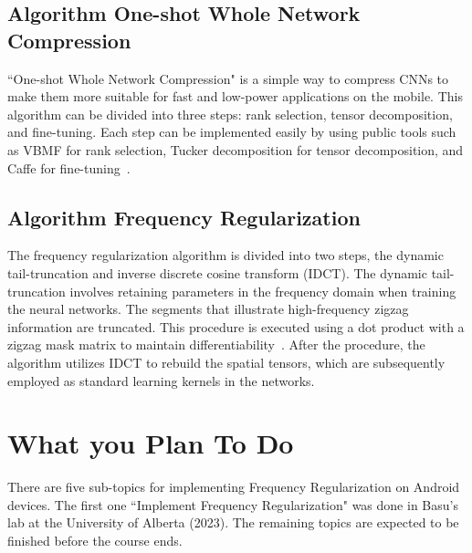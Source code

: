 \documentclass{article}
\begin{document}
\subsection{Algorithm One-shot Whole Network Compression}\label{oneshot}
``One-shot Whole Network Compression" is a simple way to compress CNNs to make them more suitable for fast and low-power applications on the mobile. This algorithm can be divided into three steps: rank selection, tensor decomposition, and fine-tuning. Each step can be implemented easily by using public tools such as VBMF for rank selection, Tucker decomposition for tensor decomposition, and Caffe for fine-tuning~\cite{kim2016compression}.

\subsection{Algorithm Frequency Regularization}\label{fr}
The frequency regularization algorithm is divided into two steps, the dynamic tail-truncation and inverse discrete cosine transform (IDCT). The dynamic tail-truncation involves retaining parameters in the frequency domain when training the neural networks. The segments that illustrate high-frequency zigzag information are truncated. This procedure is executed using a dot product with a zigzag mask matrix to maintain differentiability~\cite{zhao2023frequency}. After the procedure, the algorithm utilizes IDCT to rebuild the spatial tensors, which are subsequently employed as standard learning kernels in the networks.


\section{What you Plan To Do}
There are five sub-topics for implementing Frequency Regularization on Android devices. The first one ``Implement Frequency Regularization" was done in Basu's lab at the University of Alberta (2023). The remaining topics are expected to be finished before the course ends.
\end{document}
